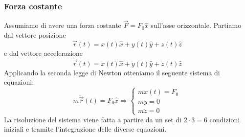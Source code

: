 \subsubsection{Forza costante}
Assumiamo di avere una forza costante $\vec{F}=F_0\widehat{x}$ sull'asse orizzontale. Partiamo dal vettore posizione 
\begin{equation*}
	\vec{r}(t) = x(t)\widehat{x}+y(t)\widehat{y}+z(t)\widehat{z}
\end{equation*}
e dal vettore accelerazione
\begin{equation*}
	\ddot{\vec{r}}(t)=\ddot{x}(t)\widehat{x}+\ddot{y}(t)\widehat{y}+\ddot{z}(t)\widehat{z}
\end{equation*}
Applicando la seconda legge di Newton otteniamo il seguente sistema di equazioni:
\begin{equation}
	m\ddot{\vec{r}}(t) = F_0 \widehat{x} \Longrightarrow \begin{cases}
		m\ddot{x}(t) = F_0 \\
		m\ddot{y} = 0\\
		m\ddot{z} = 0
	\end{cases}
\end{equation}
La risoluzione del sistema viene fatta a partire da un set di $2 \cdot 3 = 6$ condizioni iniziali e tramite l'integrazione delle diverse equazioni.

